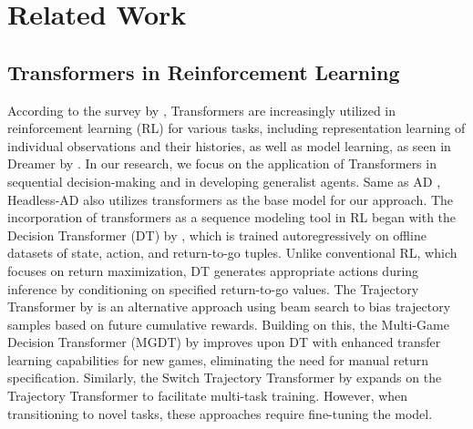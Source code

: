 \documentclass{article}
\theoremstyle{plain}
\theoremstyle{definition}
\theoremstyle{remark}
\begin{document}
\section{Related Work}
\label{appendix:related_work}
\subsection{Transformers in Reinforcement Learning}
According to the survey by \citet{li2023survey}, Transformers \citep{vaswani2017attention} are increasingly utilized in reinforcement learning (RL) for various tasks, including representation learning of individual observations and their histories, as well as model learning, as seen in Dreamer by \citet{hafner2019dream}. In our research, we focus on the application of Transformers in sequential decision-making and in developing generalist agents. Same as AD \citep{laskin2022context}, Headless-AD also utilizes transformers as the base model for our approach.
The incorporation of transformers as a sequence modeling tool in RL began with the Decision Transformer (DT) by \citep{hu2022transforming}, which is trained autoregressively on offline datasets of state, action, and return-to-go tuples. Unlike conventional RL, which focuses on return maximization, DT generates appropriate actions during inference by conditioning on specified return-to-go values. The Trajectory Transformer by \citet{janner2021offline} is an alternative approach using beam search to bias trajectory samples based on future cumulative rewards. Building on this, the Multi-Game Decision Transformer (MGDT) by \citet{lee2022multi} improves upon DT with enhanced transfer learning capabilities for new games, eliminating the need for manual return specification. Similarly, the Switch Trajectory Transformer by \citep{lin2022switch} expands on the Trajectory Transformer to facilitate multi-task training. However, when transitioning to novel tasks, these approaches require fine-tuning the model.
\end{document}
